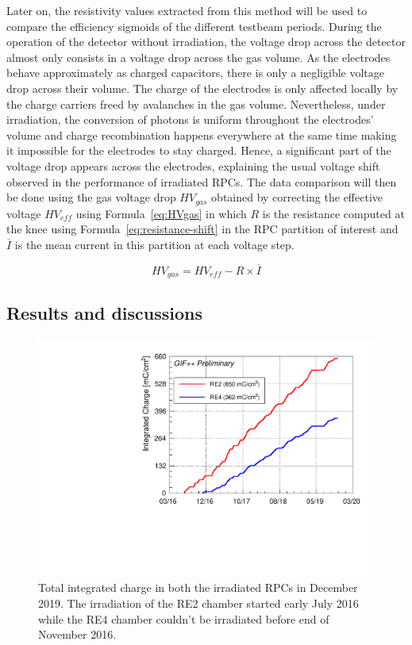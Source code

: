 	Later on, the resistivity values extracted from this method will be used to compare the efficiency sigmoids of the different testbeam periods. During the operation of the detector without irradiation, the voltage drop across the detector almost only consists in a voltage drop across the gas volume. As the electrodes behave approximately as charged capacitors, there is only a negligible voltage drop across their volume. The charge of the electrodes is only affected locally by the charge carriers freed by avalanches in the gas volume. Nevertheless, under irradiation, the conversion of photons is uniform throughout the electrodes' volume and charge recombination happens everywhere at the same time making it impossible for the electrodes to stay charged. Hence, a significant part of the voltage drop appears across the electrodes, explaining the usual voltage shift observed in the performance of irradiated RPCs. The data comparison will then be done using the gas voltage drop $HV_{gas}$ obtained by correcting the effective voltage $HV_{eff}$ using Formula~\ref{eq:HVgas} in which $R$ is the resistance computed at the knee using Formula~\ref{eq:resistance-shift} in the RPC partition of interest and $\overline{I}$ is the mean current in this partition at each voltage step.
	
	\begin{equation}
	\label{eq:HVgas}
		HV_{gas} = HV_{eff} - R\times\overline{I}
	\end{equation}
	
	\subsection{Results and discussions}
	\label{chapt5:ssec:resultsGIFpp}
	
\begingroup\setlength{\intextsep}{0pt}\setlength{\columnsep}{15pt}
	
	\begin{figure}
        \centering
		\includegraphics[width = \linewidth]{fig/chapt5/GIFpp-Qint.pdf}
		\caption{\label{fig:GIFppQint} Total integrated charge in both the irradiated RPCs in December 2019. The irradiation of the RE2 chamber started early July 2016 while the RE4 chamber couldn't be irradiated before end of November 2016.}
	\end{figure}
    
